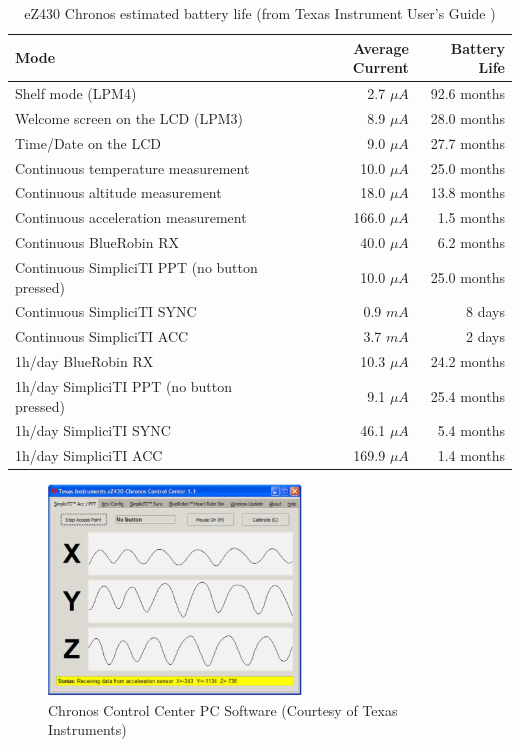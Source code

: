 \begin{table}[h]
  \centering
    \begin{tabular}{|l|r|r|}
        \hline
        \textbf{Mode} & \textbf{Average Current} & \textbf{Battery Life} \\ \hline
        Shelf mode (LPM4) & 2.7 $\mu A$ & 92.6 months \\ \hline
        Welcome screen on the LCD (LPM3) & 8.9 $\mu A$ & 28.0 months \\ \hline
        Time/Date on the LCD & 9.0 $\mu A$ & 27.7 months \\ \hline
        Continuous temperature measurement & 10.0 $\mu A$ & 25.0 months \\ \hline
        Continuous altitude measurement & 18.0 $\mu A$ & 13.8 months \\ \hline
        Continuous acceleration measurement & 166.0 $\mu A$ & 1.5 months \\ \hline
        Continuous BlueRobin RX & 40.0 $\mu A$ & 6.2 months \\ \hline
        Continuous SimpliciTI PPT (no button pressed) & 10.0 $\mu A$ & 25.0 months \\ \hline
        Continuous SimpliciTI SYNC & 0.9 $m A$ & 8 days \\ \hline
        Continuous SimpliciTI ACC & 3.7 $m A$ & 2 days \\ \hline
        1h/day BlueRobin RX & 10.3 $\mu A$ & 24.2 months \\ \hline
        1h/day SimpliciTI PPT (no button pressed) & 9.1 $\mu A$ & 25.4 months \\ \hline
        1h/day SimpliciTI SYNC & 46.1 $\mu A$ & 5.4 months \\ \hline
        1h/day SimpliciTI ACC & 169.9 $\mu A$ & 1.4 months \\ \hline
    \end{tabular}
  \caption{eZ430 Chronos estimated battery life (from Texas Instrument User's Guide \cite{eZ430Chronos})}
  \label{tab:power-specification}
\end{table}

\begin{figure}[h]
  \centering
  \includegraphics[width=0.6\textwidth]{img/chronos_app_control_center.png}
  \caption{Chronos Control Center PC Software (Courtesy of Texas
  Instruments)}
  \label{fig:chronos_control_center}
\end{figure}


